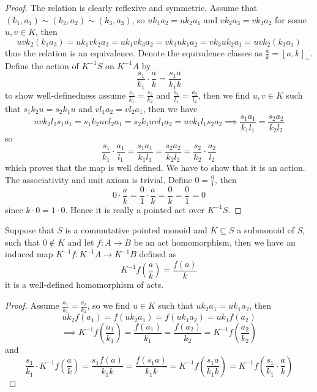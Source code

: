 \begin{proof}[Proof]
    The relation is clearly reflexive and symmetric. Assume 
    that $(k_1,a_1)\sim(k_2,a_2)\sim(k_3,a_3)$, so 
    $uk_1a_2 = uk_2a_1$ and $vk_2a_3 = vk_3a_2$ for some $u,v\in K$, then 
    \[
        uvk_2(k_1a_3) = uk_1vk_2a_3 = uk_1vk_3a_2 = vk_3uk_1a_2 = vk_3uk_2a_1 = uvk_2(k_3a_1)
    \] 
    thus the relation is an equivalence. Denote the equivalence classes as $\frac{a}{k} = [a,k]_\sim$. 
    Define the action of $K^{-1}S$ on $K^{-1}A$ by 
    \[
        \frac{s_1}{k_1}\cdot\frac{a}{k} = \frac{s_1 a}{k_1 k}
    \]
    to show well-definedness assume $\frac{s_1}{k_1}=\frac{s_2}{k_2}$ and $\frac{a_1}{l_1}=\frac{a_2}{l_2}$, then 
    we find $u,v\in K$ such that $s_1k_2u = s_2k_1u$ and $vl_1a_2 = vl_2a_1$, then we have 
    \[
        uvk_2l_2s_1a_1 = s_1k_2uvl_2a_1 = s_2k_1uvl_1a_2 = uvk_1l_1s_2a_2 \implies \frac{s_1a_1}{k_1l_1} = \frac{s_2a_2}{k_2l_2}
    \]
    so
    \[
        \frac{s_1}{k_1}\cdot\frac{a_1}{l_1} = \frac{s_1a_1}{k_1l_1} = \frac{s_2a_2}{k_2l_2} = \frac{s_2}{k_2}\cdot\frac{a_2}{l_2}
    \]
    which proves that the map is well defined. We have to show that it is an action. 
    The associativity and unit axiom is trivial. Define $0 = \frac{0}{1}$, then 
    \[
        0\cdot\frac{a}{k} = \frac{0}{1}\cdot \frac{a}{k} = \frac{0}{k} = \frac{0}{1} = 0
    \]
    since $k\cdot 0 = 1\cdot 0$. Hence it is really a pointed act over $K^{-1}S$. 
\end{proof}
\begin{proposition}
    Suppose that $S$ is a commutative pointed monoid and $K\subseteq S$ a submonoid of $S$, such that $0\not\in K$ and let $f: A\to B$ be an act homomorphism, then we have an induced 
    map $K^{-1}f : K^{-1}A \to K^{-1}B$ defined as 
    \[
        K^{-1}f\left(\frac{a}{k}\right) = \frac{f(a)}{k}
    \] 
    it is a well-defined homomorphism of acts.
\end{proposition}
\begin{proof}[Proof]
    Assume $\frac{a_1}{k_1}=\frac{a_2}{k_2}$, so we find $u\in K$ such that 
    $uk_2a_1= uk_1a_2$, then 
    \[
        uk_2f(a_1) = f(uk_2a_1) = f(uk_1a_2) = uk_1f(a_2)\] 
        \[ \implies K^{-1}f\left(\frac{a_1}{k_1}\right)=\frac{f(a_1)}{k_1}=\frac{f(a_2)}{k_2} = K^{-1}f\left(\frac{a_2}{k_2}\right)
    \]
    and 
    \[
    \frac{s_1}{k_1}\cdot K^{-1}f\left(\frac{a}{k}\right) = \frac{s_1f(a)}{k_1k} = \frac{f(s_1a)}{k_1k} = 
    K^{-1}f\left(\frac{s_1a}{k_1k}\right) = K^{-1}f\left(\frac{s_1}{k_1}\cdot\frac{a}{k}\right)
    \]
\end{proof}
